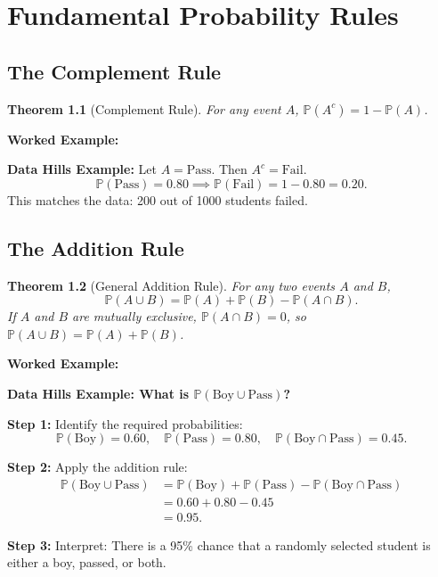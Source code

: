 \documentclass[12pt,a4paper,oneside]{report}
\theoremstyle{mytheorem}
\newtheorem{theorem}{Theorem}[chapter]
\theoremstyle{mydefinition}
\theoremstyle{myremark}
\newenvironment{worked}{%
  \par\medskip\noindent\textbf{\color{myorange}Worked Example:}\par\smallskip
}{%
  \par\medskip
}
\newcommand{\Prob}{\mathbb{P}}
\begin{document}
\chapter{Fundamental Probability Rules}

\section{The Complement Rule}
\begin{theorem}[Complement Rule]
For any event $A$, $\Prob(A^c) = 1 - \Prob(A)$.
\end{theorem}

\begin{worked}
\textbf{Data Hills Example:}
Let $A = \text{Pass}$. Then $A^c = \text{Fail}$.
\[
\Prob(\text{Pass}) = 0.80 \implies \Prob(\text{Fail}) = 1 - 0.80 = 0.20.
\]
This matches the data: 200 out of 1000 students failed.
\end{worked}

\section{The Addition Rule}
\begin{theorem}[General Addition Rule]
For any two events $A$ and $B$,
\[
\Prob(A \cup B) = \Prob(A) + \Prob(B) - \Prob(A \cap B).
\]
If $A$ and $B$ are mutually exclusive, $\Prob(A \cap B) = 0$, so $\Prob(A \cup B) = \Prob(A) + \Prob(B)$.
\end{theorem}

\begin{worked}
\textbf{Data Hills Example: What is $\Prob(\text{Boy} \cup \text{Pass})$?}

\textbf{Step 1:} Identify the required probabilities:
\[
\Prob(\text{Boy}) = 0.60, \quad \Prob(\text{Pass}) = 0.80, \quad \Prob(\text{Boy} \cap \text{Pass}) = 0.45.
\]

\textbf{Step 2:} Apply the addition rule:
\begin{align*}
\Prob(\text{Boy} \cup \text{Pass})
&= \Prob(\text{Boy}) + \Prob(\text{Pass}) - \Prob(\text{Boy} \cap \text{Pass}) \\
&= 0.60 + 0.80 - 0.45 \\
&= 0.95.
\end{align*}

\textbf{Step 3:} Interpret: There is a 95\% chance that a randomly selected student is either a boy, passed, or both.
\end{worked}
\end{document}
